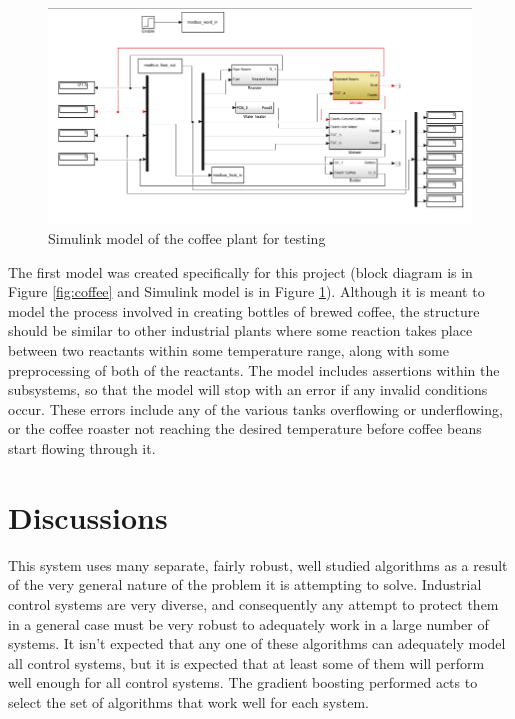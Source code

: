 \documentclass[10pt,twocolumn]{IEEEtran}
\begin{document}
\begin{figure}
  \centering
  \includegraphics[width=\textwidth]{coffee_simulink.png}
  \caption{Simulink model of the coffee plant for testing}
  \label{fig:coffee_simulink}
\end{figure}

The first model was created specifically for this project (block diagram is in Figure \ref{fig:coffee} and Simulink model is in Figure \ref{fig:coffee_simulink}).
Although it is meant to model the process involved in creating bottles of brewed coffee, the structure should be similar to other industrial plants where some reaction takes place between two reactants within some temperature range, along with some preprocessing of both of the reactants.
The model includes assertions within the subsystems, so that the model will stop with an error if any invalid conditions occur.
These errors include any of the various tanks overflowing or underflowing, or the coffee roaster not reaching the desired temperature before coffee beans start flowing through it.

\section{Discussions}\label{sec:discussion}
This system uses many separate, fairly robust, well studied algorithms as a result of the very general nature of the problem it is attempting to solve.
Industrial control systems are very diverse, and consequently any attempt to protect them in a general case must be very robust to adequately work in a large number of systems.
It isn't expected that any one of these algorithms can adequately model all control systems, but it is expected that at least some of them will perform well enough for all control systems.
The gradient boosting performed acts to select the set of algorithms that work well for each system.
\end{document}
